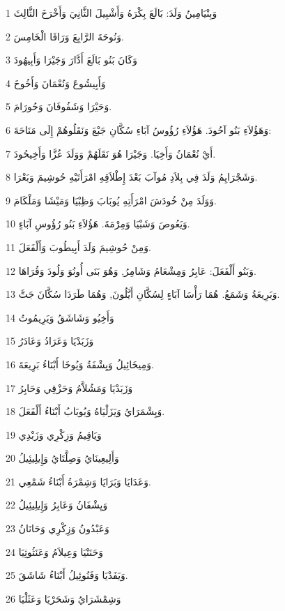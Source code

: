 \par 1 وَبِنْيَامِينُ وَلَدَ: بَالَعَ بِكْرَهُ وَأَشْبِيلَ الثَّانِيَ وَأَخْرَخَ الثَّالِثَ
\par 2 وَنُوحَةَ الرَّابِعَ وَرَافَا الْخَامِسَ.
\par 3 وَكَانَ بَنُو بَالَعَ أَدَّارَ وَجَيْرَا وَأَبِيهُودَ
\par 4 وَأَبِيشُوعَ وَنُعْمَانَ وَأَخُوخَ
\par 5 وَحَيْرَا وَشَفُوفَانَ وَحُورَامَ.
\par 6 وَهَؤُلاَءِ بَنُو آحُودَ. هَؤُلاَءِ رُؤُوسُ آبَاءِ سُكَّانِ جَبْعَ وَنَقَلُوهُمْ إِلَى مَنَاحَةَ:
\par 7 أَيْ نُعْمَانُ وَأَخِيَا. وَجَيْرَا هُوَ نَقَلَهُمْ وَوَلَدَ عُزَّا وَأَخِيحُودَ.
\par 8 وَشَجْرَايِمُ وَلَدَ فِي بِلاَدِ مُوآبَ بَعْدَ إِطْلاَقِهِ امْرَأَتَيْهِ حُوشِيمَ وَبَعْرَا.
\par 9 وَوَلَدَ مِنْ خُودَشَ امْرَأَتِهِ يُوبَابَ وَظِبْيَا وَمَيْشَا وَمَلْكَامَ.
\par 10 وَيَعُوصَ وَشَبْيَا وَمِرْمَةَ. هَؤُلاَءِ بَنُو رُؤُوسِ آبَاءٍ.
\par 11 وَمِنْ حُوشِيمَ وَلَدَ أَبِيطُوبَ وَأَلْفَعَلَ.
\par 12 وَبَنُو أَلْفَعَلَ: عَابِرُ وَمِشْعَامُ وَشَامِرُ, وَهُوَ بَنَى أُونُوَ وَلُودَ وَقُرَاهَا.
\par 13 وَبَرِيعَةُ وَشَمَعُ. هُمَا رَأْسَا آبَاءٍ لِسُكَّانِ أَيَّلُونَ, وَهُمَا طَرَدَا سُكَّانَ جَتَّ.
\par 14 وَأَخِيُو وَشَاشَقُ وَيَرِيمُوتُ
\par 15 وَزَبَدْيَا وَعَرَادُ وَعَادَرُ
\par 16 وَمِيخَائِيلُ وَيِشْفَةُ وَيُوخَا أَبْنَاءُ بَرِيعَةَ.
\par 17 وَزَبَدْيَا وَمَشُلاَّمُ وَحَزْقِي وَحَابِرُ
\par 18 وَيِشْمَرَايُ وَيَزَلْيَاهُ وَيُوبَابُ أَبْنَاءُ أَلْفَعَلَ.
\par 19 وَيَاقِيمُ وَزِكْرِي وَزَبْدِي
\par 20 وَأَلِيعِينَايُ وَصِلَّتَايُ وَإِيلِيئِيلُ
\par 21 وَعَدَايَا وَبَرَايَا وَشِمْرَةُ أَبْنَاءُ شَمْعِي.
\par 22 وَيِشْفَانُ وَعَابِرُ وَإِيلِيئِيلُ
\par 23 وَعَبْدُونُ وَزِكْرِي وَحَانَانُ
\par 24 وَحَنَنْيَا وَعِيلاَمُ وَعَنَثُوثِيَا
\par 25 وَيَفَدْيَا وَفَنُوئِيلُ أَبْنَاءُ شَاشَقَ.
\par 26 وَشِمْشَرَايُ وَشَحَرْيَا وَعَثَلْيَا
